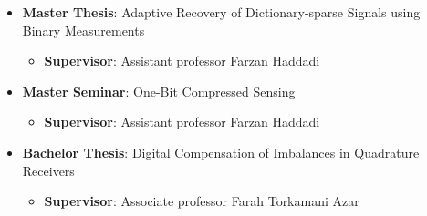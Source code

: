 

\begin{itemize}
	\item{
	            \textbf{Master Thesis}: Adaptive Recovery of Dictionary-sparse Signals using Binary Measurements
	            \begin{itemize}
		            \item \textbf{Supervisor}: Assistant professor Farzan Haddadi
	            \end{itemize}
	      }
	\item{
	            \textbf{Master Seminar}: One-Bit Compressed Sensing
	            \begin{itemize}
		            \item \textbf{Supervisor}: Assistant professor Farzan Haddadi
	            \end{itemize}
	      }
	\item{
	            \textbf{Bachelor Thesis}: Digital Compensation of Imbalances in Quadrature Receivers
	            \begin{itemize}
		            \item \textbf{Supervisor}: Associate professor Farah Torkamani Azar
	            \end{itemize}
	      }
\end{itemize}
